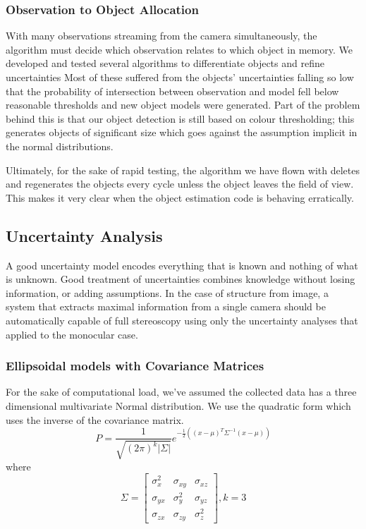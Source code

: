 \documentclass[a4paper, 11pt, titlepage]{article}
\begin{document}
    \subsubsection{Observation to Object Allocation}
      \label{sec:objectAllocation}
      With many observations streaming from the camera simultaneously, the algorithm must decide which observation relates to which object in memory.  We developed and tested several algorithms to differentiate objects and refine uncertainties
      Most of these suffered from the objects' uncertainties falling so low that the probability of intersection between observation and model fell below reasonable thresholds and new object models were generated.  Part of the problem behind this is that our object detection is still based on colour thresholding; this generates objects of significant size which goes against the assumption implicit in the normal distributions.

      Ultimately, for the sake of rapid testing, the algorithm we have flown with deletes and regenerates the objects every cycle unless the object leaves the field of view.  This makes it very clear when the object estimation code is behaving erratically.

  \subsection{Uncertainty Analysis}
    A good uncertainty model encodes everything that is known and nothing of what is unknown.
    Good treatment of uncertainties combines knowledge without losing information, or adding assumptions.
    In the case of structure from image, a system that extracts maximal information from a single camera should be automatically capable of full stereoscopy using only the uncertainty analyses that applied to the monocular case.
    \subsubsection{Ellipsoidal models with Covariance Matrices}
      For the sake of computational load, we've assumed the collected data has a three dimensional multivariate Normal distribution.  We use the quadratic form which uses the inverse of the covariance matrix.
      \begin{equation}
      P = \frac{1}{\sqrt{(2\pi)^k|\Sigma|}} e^{-\frac{1}{2}\left( \left(x-\mu\right)^T \Sigma^{-1} \left(x-\mu\right) \right)}
      \end{equation}
      where
      \begin{equation}
      \Sigma=\begin{bmatrix}
        \sigma_x^2 & \sigma_{xy} & \sigma_{xz} \\[0.3em]
        \sigma_{yx} & \sigma_y^2 & \sigma_{yz} \\[0.3em]
        \sigma_{zx} & \sigma_{zy} & \sigma_z^2 
      \end{bmatrix}, k=3
      \end{equation}
\end{document}
